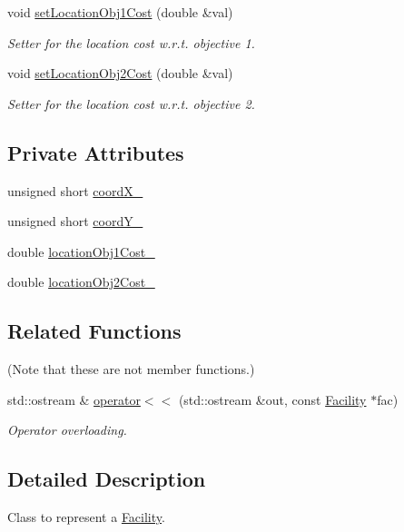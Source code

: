 \begin{DoxyCompactItemize}
void \hyperlink{classFacility_a2c3858ee3c24ae4365c2a863ee526bd7}{set\-Location\-Obj1\-Cost} (double \&val)
\begin{DoxyCompactList}\small\item\em \-Setter for the location cost w.\-r.\-t. objective 1. \end{DoxyCompactList}\item 
void \hyperlink{classFacility_aed009311f964602ca82724e5e09058ff}{set\-Location\-Obj2\-Cost} (double \&val)
\begin{DoxyCompactList}\small\item\em \-Setter for the location cost w.\-r.\-t. objective 2. \end{DoxyCompactList}\end{DoxyCompactItemize}
\subsection*{\-Private \-Attributes}
\begin{DoxyCompactItemize}
\item 
unsigned short \hyperlink{classFacility_a46e539865a0161f0a2c5e7644ea5d75d}{coord\-X\-\_\-}
\item 
unsigned short \hyperlink{classFacility_a2a72bbcf1fe5dc2faee8a02a918fc29f}{coord\-Y\-\_\-}
\item 
double \hyperlink{classFacility_a0239174cc91d2bab7829a4e460cad3be}{location\-Obj1\-Cost\-\_\-}
\item 
double \hyperlink{classFacility_a09096b7ea289d3e4a6782c188b1a0e4d}{location\-Obj2\-Cost\-\_\-}
\end{DoxyCompactItemize}
\subsection*{\-Related \-Functions}
(\-Note that these are not member functions.) \begin{DoxyCompactItemize}
\item 
std\-::ostream \& \hyperlink{classFacility_a0a2f02efa3d9bd071e9fa6e9197e7b71}{operator$<$$<$} (std\-::ostream \&out, const \hyperlink{classFacility}{\-Facility} $\ast$fac)
\begin{DoxyCompactList}\small\item\em \-Operator overloading. \end{DoxyCompactList}\end{DoxyCompactItemize}


\subsection{\-Detailed \-Description}
\-Class to represent a {\ttfamily \hyperlink{classFacility}{\-Facility}}. 

